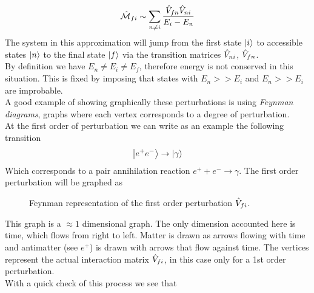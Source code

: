 \documentclass[../qm.tex]{subfiles}
\begin{document}
\begin{equation*}
	\hat{\mathcal{M}}_{fi}\sim\sum_{n\ne i}\frac{\hat{V}_{fn}\hat{V}_{ni}}{E_i-E_n}
\end{equation*}
The system in this approximation will jump from the first state $\ket{i}$ to accessible states $\ket{n}$ to the final state $\ket{f}$ via the transition matrices $\hat{V}_{ni}$, $\hat{V}_{fn}$.\\
By definition we have $E_n\ne E_i\ne E_f$, therefore energy is not conserved in this situation. This is fixed by imposing that states with $E_n>>E_i$ and $E_n>>E_i$ are improbable.\\
A good example of showing graphically these perturbations is using \emph{Feynman diagrams}, graphs where each vertex corresponds to a degree of perturbation.\\
At the first order of perturbation we can write as an example the following transition
\begin{equation*}
	\ket{e^+e^-}\to\ket{\gamma}
\end{equation*}
Which corresponds to a pair annihilation reaction $e^++e^-\to\gamma$. The first order perturbation will be graphed as
\begin{figure}[H]
	\centering
	\caption{Feynman representation of the first order perturbation $\hat{V}_{fi}$.}
	\label{fig:feynmandiagram1node}
\end{figure}
This graph is a $\approx1$ dimensional graph. The only dimension accounted here is time, which flows from right to left. Matter is drawn as arrows flowing with time and antimatter (see $e^+$) is drawn with arrows that flow against time. The vertices represent the actual interaction matrix $\hat{V}_{fi}$, in this case only for a 1st order perturbation.\\
With a quick check of this process we see that
\end{document}
